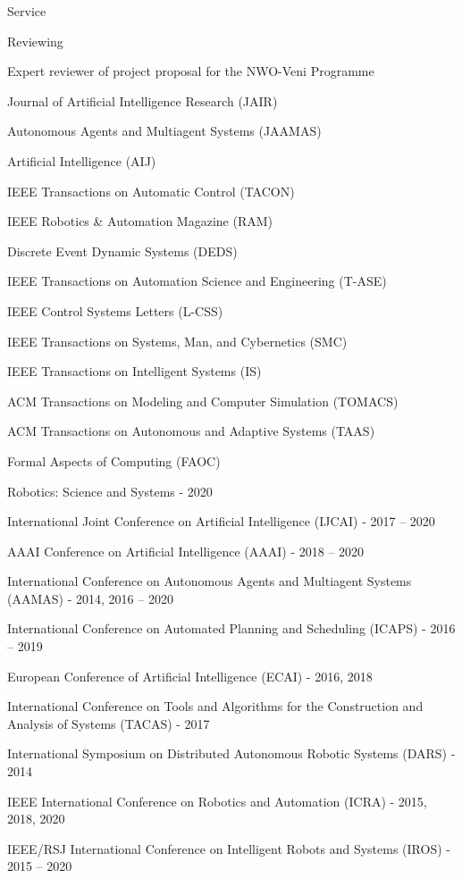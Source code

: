 \begin{rSection}{Service}
\begin{rSubsection}{Reviewing}{}{}{}
\item Expert reviewer of project proposal for the NWO-Veni Programme
\item Journal of Artificial Intelligence Research (JAIR)
\item Autonomous Agents and Multiagent Systems (JAAMAS)
\item  Artificial Intelligence (AIJ)
\item  IEEE Transactions on Automatic Control (TACON)
\item  IEEE Robotics \& Automation Magazine (RAM)
\item  Discrete Event Dynamic Systems (DEDS)
\item  IEEE Transactions on Automation Science and Engineering (T-ASE)
\item   IEEE Control Systems Letters (L-CSS)
\item  IEEE Transactions on Systems, Man, and Cybernetics (SMC)
\item   IEEE Transactions on Intelligent Systems (IS)
\item ACM Transactions on Modeling and Computer Simulation (TOMACS)
\item ACM Transactions on Autonomous and Adaptive Systems (TAAS)
\item Formal Aspects of Computing (FAOC)
\item Robotics: Science and Systems - 2020
\item  International Joint Conference on Artificial Intelligence (IJCAI) - 2017 -- 2020
\item  AAAI Conference on Artificial Intelligence (AAAI) - 2018 -- 2020
\item  International Conference on Autonomous Agents and Multiagent Systems (AAMAS) - 2014, 2016 -- 2020
\item  International Conference on Automated Planning and Scheduling (ICAPS) - 2016 -- 2019
\item  European Conference of Artificial Intelligence (ECAI) - 2016, 2018
\item  International Conference on Tools and Algorithms for the Construction and Analysis of Systems (TACAS) - 2017
\item  International Symposium on Distributed Autonomous Robotic Systems (DARS) - 2014
\item  IEEE International Conference on Robotics and Automation (ICRA) - 2015, 2018, 2020
\item  IEEE/RSJ International Conference on Intelligent Robots and Systems (IROS) - 2015 -- 2020

\end{rSubsection}
\end{rSection}
